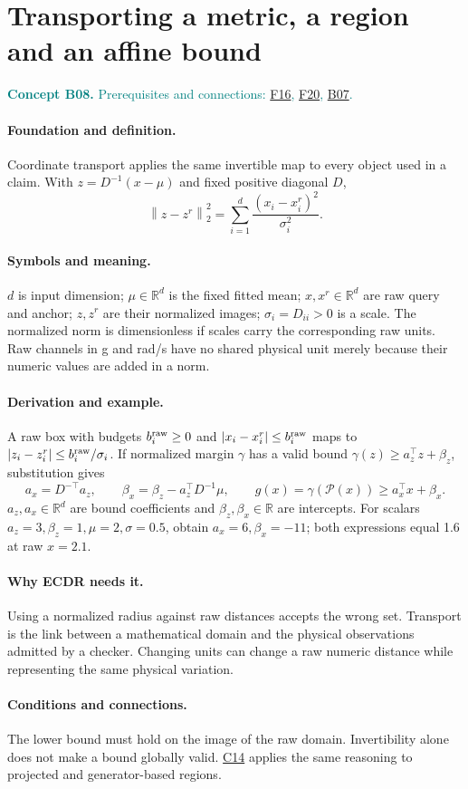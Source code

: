\documentclass[11pt,a4paper]{article}
\newcommand{\R}{\mathbb R}
\newcommand{\norm}[1]{\left\lVert#1\right\rVert}
\newcommand{\conceptid}{Front matter}
\newcommand{\concept}[3]{\clearpage\renewcommand{\conceptid}{#1}%
\section{#2}\label{concept:#1}%
\textcolor{teal}{\textbf{Concept #1.} Prerequisites and connections: #3.}\par
\typeout{ECDR-CONCEPT-START #1 PAGE=\thepage}}
\begin{document}
\concept{B08}{Transporting a metric, a region and an affine bound}{\hyperref[concept:F16]{F16}, \hyperref[concept:F20]{F20}, \hyperref[concept:B07]{B07}}
\paragraph{Foundation and definition.}
Coordinate transport applies the same invertible map to every object used
in a claim. With $z=D^{-1}(x-\mu)$ and fixed positive diagonal $D$,
\[
 \norm{z-z^r}_2^2=\sum_{i=1}^{d}\frac{(x_i-x_i^r)^2}{\sigma_i^2}.
\]
\paragraph{Symbols and meaning.}
$d$ is input dimension; $\mu\in\R^d$ is the fixed fitted mean;
$x,x^r\in\R^d$ are raw query and anchor;
$z,z^r$ are their normalized images; $\sigma_i=D_{ii}>0$ is a scale.
The normalized norm is dimensionless if scales carry the corresponding
raw units. Raw channels in g and rad/s have no shared physical unit merely
because their numeric values are added in a norm.
\paragraph{Derivation and example.}
A raw box with budgets $b_i^{\rm raw}\ge0$ and $|x_i-x_i^r|\le b_i^{\rm raw}$ maps to
$|z_i-z_i^r|\le b_i^{\rm raw}/\sigma_i$. If normalized margin
$\gamma$ has a valid bound $\gamma(z)\ge a_z^\top z+\beta_z$, substitution gives
\[
 a_x=D^{-\top}a_z,\qquad
 \beta_x=\beta_z-a_z^\top D^{-1}\mu,
 \qquad g(x)=\gamma(\mathcal P(x))\ge a_x^\top x+\beta_x.
\]
$a_z,a_x\in\R^d$ are bound coefficients and $\beta_z,\beta_x\in\R$ are
intercepts. For scalars $a_z=3,\beta_z=1,\mu=2,\sigma=0.5$, obtain
$a_x=6,\beta_x=-11$; both expressions equal 1.6 at raw $x=2.1$.
\paragraph{Why ECDR needs it.}
Using a normalized radius against raw distances accepts the wrong set.
Transport is the link between a mathematical domain and the physical
observations admitted by a checker. Changing units can change a raw
numeric distance while representing the same physical variation.
\paragraph{Conditions and connections.}
The lower bound must hold on the image of the raw domain. Invertibility
alone does not make a bound globally valid. \hyperref[concept:C14]{C14} applies the same reasoning
to projected and generator-based regions.
\par\label{endconcept:B08}
\end{document}
